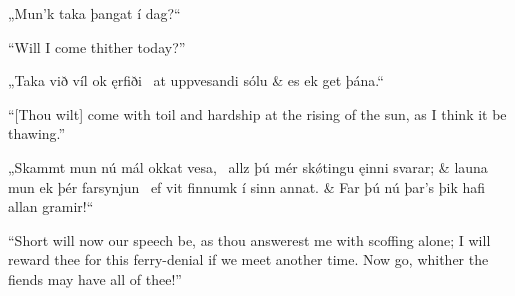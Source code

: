 \bvg
\bva{}„Mun’k taka þangat í dag?“\eva

\bvb “Will I come thither today?”\evb
\evg


\bvg
\bva{}„Taka við víl ok ęrfiði \hld\ at uppvesandi sólu &
es ek get þána.“\eva

\bvb “[Thou wilt] come with toil and hardship at the rising of the sun, as I think it be thawing.”\evb
\evg


\bvg
\bva{}„Skammt mun nú mál okkat vesa, \hld\ allz þú mér skǿtingu ęinni svarar; &
launa mun ek þér farsynjun \hld\ ef vit finnumk í sinn annat. &
Far þú nú þar’s þik hafi allan gramir!“\eva

\bvb “Short will now our speech be, as thou answerest me with scoffing alone; I will reward thee for this ferry-denial if we meet another time. Now go, whither the fiends may have all of thee!”\evb
\evg
